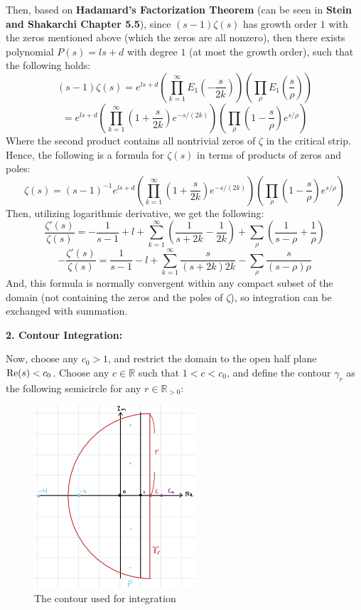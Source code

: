 \documentclass{article}
\begin{document}
Then, based on \textbf{Hadamard's Factorization Theorem} (can be seen in \textbf{Stein and Shakarchi Chapter 5.5}), since $(s-1)\zeta(s)$ has growth order $1$ with the zeros mentioned above (which the zeros are all nonzero), then there exists polynomial $P(s) = ls+d$ with degree $1$ (at most the growth order), such that the following holds:
$$(s-1)\zeta(s)=e^{ls+d}\left(\prod_{k=1}^{\infty}E_1\left(-\frac{s}{2k}\right)\right)\left(\prod_{\rho}E_1\left(\frac{s}{\rho}\right)\right)$$
$$ = e^{ls+d}\left(\prod_{k=1}^{\infty}\left(1+\frac{s}{2k}\right)e^{-s/(2k)}\right)\left(\prod_{\rho}\left(1-\frac{s}{\rho}\right)e^{s/\rho}\right)$$
Where the second product contains all nontrivial zeros of $\zeta$ in the critical strip. Hence, the following is a formula for $\zeta(s)$ in terms of products of zeros and poles:
$$\zeta(s) = (s-1)^{-1}e^{ls+d}\left(\prod_{k=1}^{\infty}\left(1+\frac{s}{2k}\right)e^{-s/(2k)}\right)\left(\prod_{\rho}\left(1-\frac{s}{\rho}\right)e^{s/\rho}\right)$$
Then, utilizing logarithmic derivative, we get the following:
$$\frac{\zeta'(s)}{\zeta(s)} = -\frac{1}{s-1}+l+\sum_{k=1}^{\infty}\left(\frac{1}{s+2k}-\frac{1}{2k}\right) + \sum_{\rho}\left(\frac{1}{s-\rho}+\frac{1}{\rho}\right)$$
$$-\frac{\zeta'(s)}{\zeta(s)}=\frac{1}{s-1}-l+\sum_{k=1}^{\infty}\frac{s}{(s+2k)2k}-\sum_{\rho}\frac{s}{(s-\rho)\rho}$$
And, this formula is normally convergent within any compact subset of the domain (not containing the zeros and the poles of $\zeta$), so integration can be exchanged with summation.

\hfil

\textbf{2. Contour Integration:}

Now, choose any $c_0>1$, and restrict the domain to the open half plane $\textmd{Re}(s)<c_0$. Choose any $c\in\mathbb{R}$ such that $1<c<c_0$, and define the contour $\gamma_{r}$ as the following semicircle for any $r\in\mathbb{R}_{>0}$:

\begin{figure}[h!]
    \begin{center}
        \includegraphics*[width=60mm]{contour2.jpg}
        \caption{The contour used for integration}
    \end{center}
\end{figure}
\end{document}
